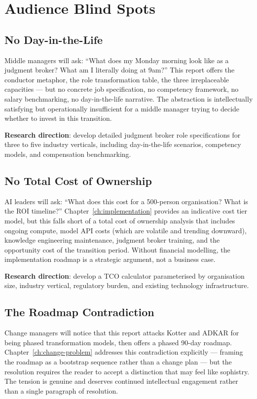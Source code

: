 \section{Audience Blind Spots}

\subsection{No Day-in-the-Life}

Middle managers will ask: ``What does my Monday morning look like as a judgment broker? What am I literally doing at 9am?'' This report offers the conductor metaphor, the role transformation table, the three irreplaceable capacities --- but no concrete job specification, no competency framework, no salary benchmarking, no day-in-the-life narrative. The abstraction is intellectually satisfying but operationally insufficient for a middle manager trying to decide whether to invest in this transition.

\textbf{Research direction}: develop detailed judgment broker role specifications for three to five industry verticals, including day-in-the-life scenarios, competency models, and compensation benchmarking.

\subsection{No Total Cost of Ownership}

AI leaders will ask: ``What does this cost for a 500-person organisation? What is the ROI timeline?'' Chapter~\ref{ch:implementation} provides an indicative cost tier model, but this falls short of a total cost of ownership analysis that includes ongoing compute, model API costs (which are volatile and trending downward), knowledge engineering maintenance, judgment broker training, and the opportunity cost of the transition period. Without financial modelling, the implementation roadmap is a strategic argument, not a business case.

\textbf{Research direction}: develop a TCO calculator parameterised by organisation size, industry vertical, regulatory burden, and existing technology infrastructure.

\subsection{The Roadmap Contradiction}

Change managers will notice that this report attacks Kotter and ADKAR for being phased transformation models, then offers a phased 90-day roadmap. Chapter~\ref{ch:change-problem} addresses this contradiction explicitly --- framing the roadmap as a bootstrap sequence rather than a change plan --- but the resolution requires the reader to accept a distinction that may feel like sophistry. The tension is genuine and deserves continued intellectual engagement rather than a single paragraph of resolution.

